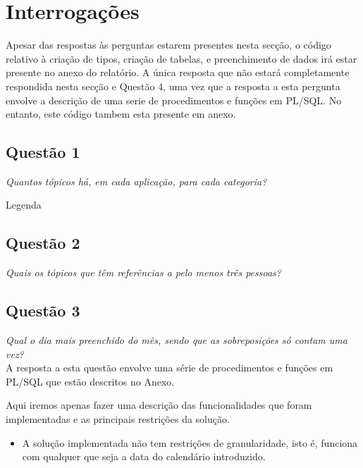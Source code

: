 \documentclass[a4paper,12pt]{article}
\begin{document}
\section{Interrogações}

	Apesar das respostas às perguntas estarem presentes nesta secção, o código relativo à criação de tipos, criação de tabelas, e preenchimento de dados irá estar presente no anexo do relatório.
	A única resposta que não estará completamente respondida nesta secção e Questão 4, uma vez que a resposta a esta pergunta envolve a descrição de uma serie de procedimentos e funções em PL/SQL. No entanto, este código tambem esta presente em anexo.

\subsection{Questão 1}

	\emph{Quantos tópicos há, em cada aplicação, para cada categoria?}\\

	\begin{program}
		\caption{Legenda}
		\label{sql:1}
	\end{program}

\subsection{Questão 2}

	\emph{Quais os tópicos que têm referências a pelo menos três pessoas?}\\

\subsection{Questão 3}

	\emph{Qual o dia mais preenchido do mês, sendo que as sobreposições só contam uma vez?	}\\

	A resposta a esta questão envolve uma série de procedimentos e funções em PL/SQL que estão descritos no Anexo.

	Aqui iremos apenas fazer uma descrição das funcionalidades que foram implementadas e as principais restrições da solução.

	\begin{itemize}
		\item	A solução implementada não tem restrições de granularidade, isto é, funciona com qualquer que seja a data do calendário introduzido. 
	\end{itemize}
\end{document}
